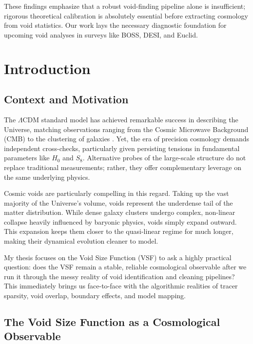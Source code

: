 \documentclass[12pt]{report}
\begin{document}
These findings emphasize that a robust void-finding pipeline alone is insufficient; rigorous theoretical calibration is absolutely essential before extracting cosmology from void statistics. Our work lays the necessary diagnostic foundation for upcoming void analyses in surveys like BOSS, DESI, and Euclid.

\chapter{Introduction}

\section{Context and Motivation}

The $\Lambda$CDM standard model has achieved remarkable success in describing the Universe, matching observations ranging from the Cosmic Microwave Background (CMB) to the clustering of galaxies \citep{Planck2020}. Yet, the era of precision cosmology demands independent cross-checks, particularly given persisting tensions in fundamental parameters like $H_0$ and $S_8$. Alternative probes of the large-scale structure do not replace traditional measurements; rather, they offer complementary leverage on the same underlying physics.

Cosmic voids are particularly compelling in this regard. Taking up the vast majority of the Universe's volume, voids represent the underdense tail of the matter distribution. While dense galaxy clusters undergo complex, non-linear collapse heavily influenced by baryonic physics, voids simply expand outward. This expansion keeps them closer to the quasi-linear regime for much longer, making their dynamical evolution cleaner to model. 

My thesis focuses on the Void Size Function (VSF) to ask a highly practical question: does the VSF remain a stable, reliable cosmological observable after we run it through the messy reality of void identification and cleaning pipelines? This immediately brings us face-to-face with the algorithmic realities of tracer sparsity, void overlap, boundary effects, and model mapping.

\section{The Void Size Function as a Cosmological Observable}
\end{document}

